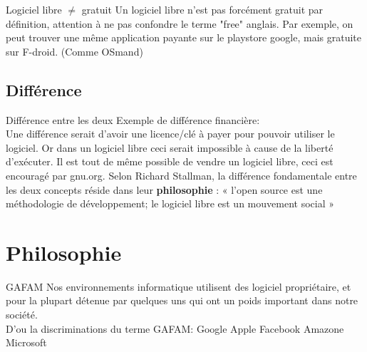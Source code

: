 \documentclass{beamer}
\begin{document}
\begin{frame}{Logiciel libre $ \ne $ gratuit}
	Un logiciel libre n'est pas forcément gratuit par définition, attention à ne pas confondre le terme "free" anglais.
	\newline
	\newline
	Par exemple, on peut trouver une même application payante sur le playstore google, mais gratuite sur F-droid. (Comme OSmand)
\end{frame}

\subsection{Différence}
\begin{frame}{Différence entre les deux}
	Exemple de différence financière: \\
	Une différence serait d'avoir une licence/clé à payer pour pouvoir utiliser le logiciel. Or dans un logiciel libre ceci serait impossible à cause de la liberté d’exécuter.
	\newline
	\newline
	Il est tout de même possible de vendre un logiciel libre, ceci est encouragé par gnu.org. 	\newline
	\newline
	Selon Richard Stallman, la différence fondamentale entre les deux concepts réside dans leur \textbf{philosophie} : « l'open source est une méthodologie de développement; le logiciel libre est un mouvement social »
\end{frame}




\section{Philosophie}
\begin{frame}{GAFAM}
Nos environnements informatique utilisent des logiciel propriétaire, et pour la plupart détenue par quelques uns qui ont un poids important dans notre société. \\
D'ou la discriminations du terme GAFAM: Google Apple Facebook Amazone Microsoft

\end{frame}
\end{document}
